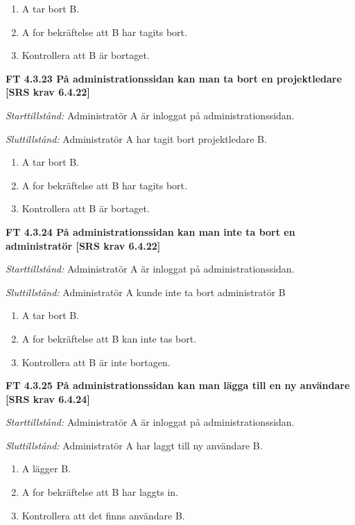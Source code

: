 \documentclass[a4paper]{article}
\begin{document}
\begin{enumerate}
\item A tar bort B.
\item A for bekräftelse att B har tagits  bort.
\item Kontrollera att B är bortaget.
\end{enumerate}

\textbf{FT 4.3.23 På administrationssidan kan man ta bort en projektledare [SRS krav 6.4.22]}

\emph{Starttillstånd:} Administratör A är inloggat på administrationssidan.

\emph{Sluttillstånd:} Administratör A har tagit bort  projektledare B.

\begin{enumerate}
\item A tar bort B.
\item A for bekräftelse att B har tagits bort.
\item Kontrollera att B är bortaget.
\end{enumerate}

\textbf{FT 4.3.24 På administrationssidan kan man inte ta bort en administratör [SRS krav 6.4.22]}

\emph{Starttillstånd:} Administratör A är inloggat på administrationssidan.

\emph{Sluttillstånd:} Administratör A kunde inte ta bort  administratör B

\begin{enumerate}
\item A tar bort B.
\item A for bekräftelse att B kan inte tas bort.
\item Kontrollera att B är inte bortagen.
\end{enumerate}

\textbf{FT 4.3.25 På administrationssidan kan man lägga till en ny användare [SRS krav 6.4.24]}

\emph{Starttillstånd:} Administratör A är inloggat på administrationssidan.

\emph{Sluttillstånd:} Administratör A har laggt till ny  användare B.

\begin{enumerate}
\item A lägger B.
\item  A for bekräftelse att B har laggts in.
\item Kontrollera att det finns användare B.
\end{enumerate}
\end{document}
